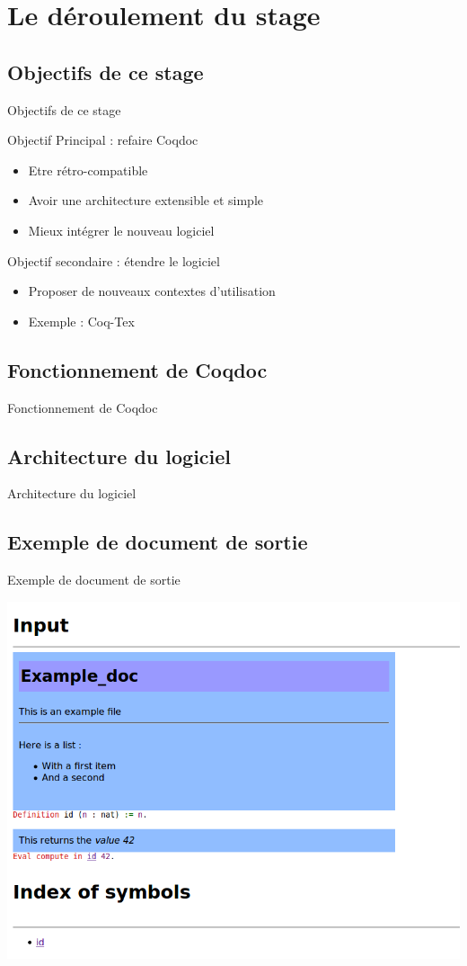 \documentclass[compress]{beamer}
\newenvironment{tframe}[1]{
  \subsection{#1}
  \begin{frame}{#1}
  }{
  \end{frame}
  }
\begin{document}
\section{Le déroulement du stage}

\begin{tframe}{Objectifs de ce stage}
  \begin{block}{Objectif Principal : refaire Coqdoc}
    \begin{itemize}
      \item Etre rétro-compatible
      \item Avoir une architecture extensible et simple
      \item Mieux intégrer le nouveau logiciel
    \end{itemize}
  \end{block}
  \begin{block}{Objectif secondaire : étendre le logiciel}
    \begin{itemize}
      \item Proposer de nouveaux contextes d'utilisation
      \item Exemple : Coq-Tex
    \end{itemize}
  \end{block}
\end{tframe}

\begin{tframe}{Fonctionnement de Coqdoc}
  \begin{figure}
    
  \end{figure}
\end{tframe}

\begin{tframe}{Architecture du logiciel}
  \begin{figure}
    
  \end{figure}
\end{tframe}

\begin{tframe}{Exemple de document de sortie}
\begin{center}
\includegraphics[scale=0.4]{input.png}
\end{center}
\end{tframe}
\end{document}
